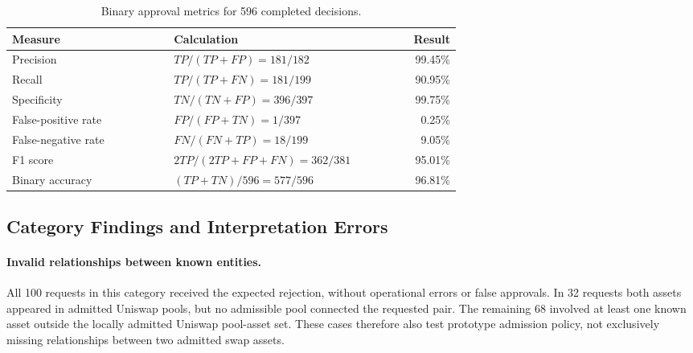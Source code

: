 \begin{table}[H]
\centering\small
\caption{Binary approval metrics for 596 completed decisions.}
\label{tab:results_binary_metrics}
\begin{tabular}{p{0.36\linewidth}p{0.29\linewidth}r}
\hline
\textbf{Measure} & \textbf{Calculation} & \textbf{Result} \\
\hline
Precision & $TP/(TP+FP)=181/182$ & 99.45\% \\
Recall & $TP/(TP+FN)=181/199$ & 90.95\% \\
Specificity & $TN/(TN+FP)=396/397$ & 99.75\% \\
False-positive rate & $FP/(FP+TN)=1/397$ & 0.25\% \\
False-negative rate & $FN/(FN+TP)=18/199$ & 9.05\% \\
F1 score & $2TP/(2TP+FP+FN)=362/381$ & 95.01\% \\
Binary accuracy & $(TP+TN)/596=577/596$ & 96.81\% \\
\hline
\end{tabular}
\end{table}

\subsection{Category Findings and Interpretation Errors}
\label{sec:results_errors_pairs}

\paragraph{Invalid relationships between known entities.}
All 100 requests in this category received the expected rejection,
without operational errors or false approvals. In 32 requests both assets
appeared in admitted Uniswap pools, but no admissible pool connected the
requested pair. The remaining 68 involved at least one known asset outside
the locally admitted Uniswap pool-asset set. These cases therefore also test
prototype admission policy, not exclusively missing relationships between
two admitted swap assets.

